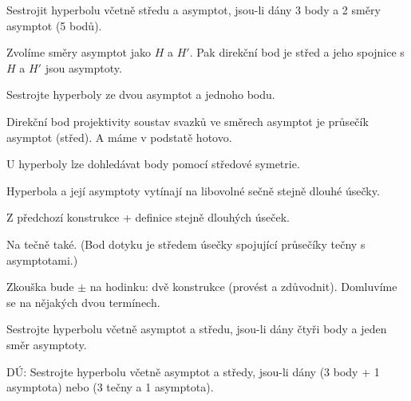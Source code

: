 \documentclass[12pt]{article}					%
\begin{document}
\begin{priklad}
	Sestrojit hyperbolu včetně středu a asymptot, jsou-li dány 3 body a 2 směry asymptot (5 bodů).

	\begin{reseni}
		Zvolíme směry asymptot jako $H$ a $H'$. Pak direkční bod je střed a jeho spojnice s $H$ a $H'$ jsou asymptoty.
	\end{reseni}
\end{priklad}

\begin{priklad}
	Sestrojte hyperboly ze dvou asymptot a jednoho bodu.

	\begin{reseni}
		Direkční bod projektivity soustav svazků ve směrech asymptot je průsečík asymptot (střed). A máme v podstatě hotovo.
	\end{reseni}

	\begin{poznamkain}
		U hyperboly lze dohledávat body pomocí středové symetrie.
	\end{poznamkain}
\end{priklad}

\begin{veta}
	Hyperbola a její asymptoty vytínají na libovolné sečně stejně dlouhé úsečky.

	\begin{dukazin}
		Z předchozí konstrukce + definice stejně dlouhých úseček.
	\end{dukazin}
\end{veta}

\begin{veta}
	Na tečně také. (Bod dotyku je středem úsečky spojující průsečíky tečny s asymptotami.)
\end{veta}

\begin{poznamka}
	Zkouška bude $±$ na hodinku: dvě konstrukce (provést a zdůvodnit). Domluvíme se na nějakých dvou termínech.
\end{poznamka}

\begin{priklad}
	Sestrojte hyperbolu včetně asymptot a středu, jsou-li dány čtyři body a jeden směr asymptoty.
\end{priklad}

\begin{priklad}
	DÚ: Sestrojte hyperbolu včetně asymptot a středy, jsou-li dány (3 body + 1 asymptota) nebo (3 tečny a 1 asymptota).
\end{priklad}
\end{document}
